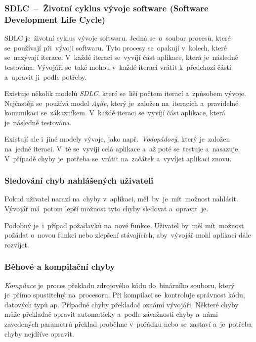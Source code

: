 \documentclass[10pt,a4paper]{article}
\begin{document}
            \subsubsection{SDLC~--~Životní cyklus vývoje software (Software Development Life Cycle)}
            SDLC je~životní cyklus vývoje softwaru. Jedná se~o~soubor procesů, které se~používají při~vývoji softwaru.
            Tyto procesy se~opakují v~kolech, které se~nazývají iterace. V~každé iteraci se~vyvíjí část aplikace, která je~následně testována.
            Vývojáři se~také mohou v~každé iteraci vrátit k~předchozí části a~upravit ji~podle potřeby.
            
            Existuje několik modelů \emph{SDLC}, které se~liší počtem iterací a~způsobem vývoje. Nejčastěji se~používá model \emph{Agile},
            který je~založen na~iteracích a~pravidelné komunikaci se~zákazníkem. V~každé iteraci se~vyvíjí část aplikace, která je~následně testována.
            
            Existují ale i~jiné modely vývoje, jako např.~\emph{Vodopádový}, který je~založen na~jedné iteraci.
            V~té se~vyvíjí celá aplikace a~až poté se~testuje a~nasazuje.
            V~případě chyby je~potřeba se~vrátit na~začátek a~vyvíjet aplikaci znovu.

            \subsubsection{Sledování chyb nahlášených uživateli}
            Pokud uživatel narazí na~chyby v~aplikaci, měl~by~je~mít~možnost nahlásit. Vývojář má~potom lepší možnost tyto chyby sledovat a~opravit~je.

            Podobný je~i~případ požadavků na~nové funkce. Uživatel by~měl mít~možnost požádat o~novou funkci nebo zlepšení stávajících,
            aby~vývojář mohl aplikaci dále rozvíjet.

            \subsubsection{Běhové a kompilační chyby}
            \emph{Kompilace} je~proces překladu zdrojového kódu do~binárního souboru, který je~přímo spustitelný na~procesoru. Při kompilaci se~kontroluje správnost kódu, datových typů ap. Případné chyby překladač oznámí vývojáři. Některé chyby může překladač opravit automaticky a~podle závažnosti chyby a~námi zavedených parametrů překlad proběhne v~pořádku nebo se~zastaví a~je~potřeba chyby nejdříve opravit.
\end{document}
